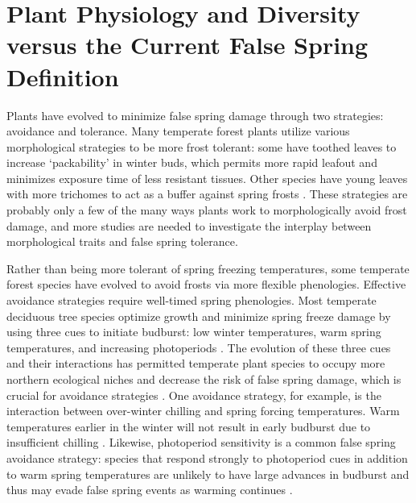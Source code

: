 \documentclass{article}\usepackage[]{graphicx}\usepackage[]{color}
\begin{document}
\section* {Plant Physiology and Diversity versus the Current False Spring Definition}
Plants have evolved to minimize false spring damage through two strategies: avoidance and tolerance. Many temperate forest plants utilize various morphological strategies to be more frost tolerant: some have toothed leaves to increase `packability' in winter buds, which permits more rapid leafout \citep{Edwards2017} and minimizes exposure time of less resistant tissues. Other species have young leaves with more trichomes to act as a buffer against spring frosts \citep{Prozherina2003, Agrawal2004}. These strategies are probably only a few of the many ways plants work to morphologically avoid frost damage, and more studies are needed to investigate the interplay between morphological traits and false spring tolerance. 

Rather than being more tolerant of spring freezing temperatures, some temperate forest species have evolved to avoid frosts via more flexible phenologies. Effective avoidance strategies require well-timed spring phenologies. Most temperate deciduous tree species optimize growth and minimize spring freeze damage by using three cues to initiate budburst: low winter temperatures, warm spring temperatures, and increasing photoperiods \citep{Chuine2010}. The evolution of these three cues and their interactions has permitted temperate plant species to occupy more northern ecological niches \citep{Kollas2014} and decrease the risk of false spring damage, which is crucial for avoidance strategies \citep{Charrier2011}. One avoidance strategy, for example, is the interaction between over-winter chilling and spring forcing temperatures. Warm temperatures earlier in the winter %
will not result in early budburst due to insufficient chilling \citep{Basler2012}. Likewise, photoperiod sensitivity is a common false spring avoidance strategy: species that respond strongly to photoperiod cues in addition to warm spring temperatures are unlikely to have large advances in budburst and thus may evade false spring events as warming continues \citep{Basler2014}. 
\end{document}
